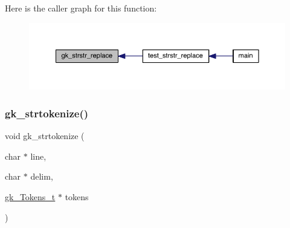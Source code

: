 Here is the caller graph for this function\+:\nopagebreak
\begin{figure}[H]
\begin{center}
\leavevmode
\includegraphics[width=350pt]{a00077_a46e5cf8f76a1ece74adf1b8b9dfcb275_icgraph}
\end{center}
\end{figure}
\mbox{\label{a00077_a10256e3a692ac19ff5056d1dc413bd29}} 
\subsubsection{\texorpdfstring{gk\+\_\+strtokenize()}{gk\_strtokenize()}}
{\footnotesize\ttfamily void gk\+\_\+strtokenize (\begin{DoxyParamCaption}\item[{char $\ast$}]{line,  }\item[{char $\ast$}]{delim,  }\item[{\hyperlink{a00654}{gk\+\_\+\+Tokens\+\_\+t} $\ast$}]{tokens }\end{DoxyParamCaption})}

